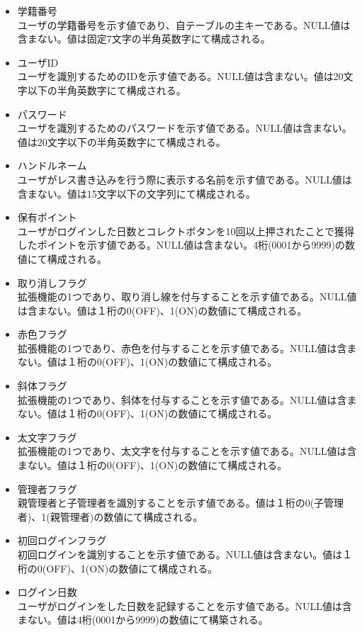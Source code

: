 \documentclass[a4j]{jarticle}
\begin{document}
\begin{itemize}
\item 学籍番号\\
  ユーザの学籍番号を示す値であり、自テーブルの主キーである。NULL値は含まない。値は固定7文字の半角英数字にて構成される。\\
\item ユーザID\\
  ユーザを識別するためのIDを示す値である。NULL値は含まない。値は20文字以下の半角英数字にて構成される。
\item パスワード\\
  ユーザを識別するためのパスワードを示す値である。NULL値は含まない。値は20文字以下の半角英数字にて構成される。\\
\item ハンドルネーム\\
      ユーザがレス書き込みを行う際に表示する名前を示す値である。NULL値は含まない。値は15文字以下の文字列にて構成される。\\


\item 保有ポイント\\
  ユーザがログインした日数とコレクトボタンを10回以上押されたことで獲得したポイントを示す値である。NULL値は含まない。4桁(0001から9999)の数値にて構成される。

\item 取り消しフラグ\\
  拡張機能の1つであり、取り消し線を付与することを示す値である。NULL値は含まない。値は１桁の0(OFF)、1(ON)の数値にて構成される。\\

\item 赤色フラグ\\
  拡張機能の1つであり、赤色を付与することを示す値である。NULL値は含まない。値は１桁の0(OFF)、1(ON)の数値にて構成される。\\
\item 斜体フラグ\\
  拡張機能の1つであり、斜体を付与することを示す値である。NULL値は含まない。値は１桁の0(OFF)、1(ON)の数値にて構成される。\\

\item 太文字フラグ\\
  拡張機能の1つであり、太文字を付与することを示す値である。NULL値は含まない。値は１桁の0(OFF)、1(ON)の数値にて構成される。\\

\item 管理者フラグ\\
  親管理者と子管理者を識別することを示す値である。値は１桁の0(子管理者)、1(親管理者)の数値にて構成される。\\
\item 初回ログインフラグ\\
  初回ログインを識別することを示す値である。NULL値は含まない。値は１桁の0(OFF)、1(ON)の数値にて構成される。

\item ログイン日数\\
  ユーザがログインをした日数を記録することを示す値である。NULL値は含まない。値は4桁(0001から9999)の数値にて構築される。

  　\end{itemize}
\newpage
\end{document}

